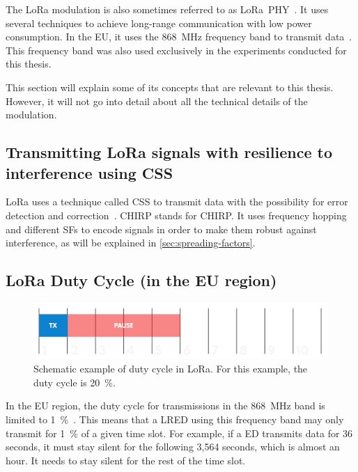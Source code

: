 The \ac{LoRa} modulation is also sometimes referred to as \ac{LoRa}\ PHY~\cite{chaudhari_understanding_2022}.
It uses several techniques to achieve long-range communication with low power consumption.
In the \ac{EU}, it uses the \SI{868}{\mega\hertz} frequency band to transmit data~\cite{lora_alliance_inc_lorawan_regional_2017}.
This frequency band was also used exclusively in the experiments conducted for this thesis.

This section will explain some of its concepts that are relevant to this thesis.
However, it will not go into detail about all the technical details of the modulation.

\subsection{Transmitting \acs{LoRa} signals with resilience to interference using \acf{CSS}}\label{sec:chirp-spread-spectrum}

\ac{LoRa} uses a technique called \acl{CSS} to transmit data with the possibility for error detection and correction~\cite{reynders_chirp_2016}.
\acs{CHIRP} stands for \acl{CHIRP}.
It uses frequency hopping and different \aclp{SF} to encode signals in order to make them robust against interference, as will be explained in \cref{sec:spreading-factors}.

\subsection{\acs{LoRa} Duty Cycle (in the \acs{EU} region)}\label{sec:duty-cycle}

\begin{figure}[htbp]
    \centering
    \includegraphics[width=.8\textwidth]{pictures/lora/duty-cycle-single-channel-off-air.png}
    \caption{
        Schematic example of duty cycle in \ac{LoRa}.
        For this example, the duty cycle is \SI{20}{\percent}.~\protect\cite{the_things_industries_bv_duty_nodate}
    }\label{pic:lora-duty-cycle}
\end{figure}

In the \ac{EU} region, the duty cycle for transmissions in the \SI{868}{\mega\hertz} band is limited to \SI{1}{\percent}~\cite[p. 29]{etsi_etsi_2012}.
This means that a \acl{LRED} using this frequency band may only transmit for \SI{1}{\percent} of a given time slot.
For example, if a \acl{ED} transmits data for 36 seconds, it must stay silent for the following 3,564 seconds, which is almost an hour.
It needs to stay silent for the rest of the time slot.


